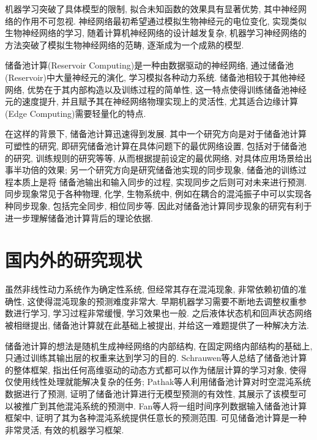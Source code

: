 \documentclass[notitlepage,cs4size,punct,oneside]{ctexrep}
\numberwithin{equation}{chapter}
\theoremstyle{mystyle}
\begin{document}
机器学习突破了具体模型的限制, 拟合未知函数的效果具有显著优势, 
其中神经网络的作用不可忽视. 神经网络最初希望通过模拟生物神经元的电位变化, 
实现类似生物神经网络的学习, 随着计算机神经网络的设计越发复杂, 机器学习神经网络的
方法突破了模拟生物神经网络的范畴, 逐渐成为一个成熟的模型. 

储备池计算(Reservoir Computing)是一种由数据驱动的神经网络, 
通过储备池(Reservoir)中大量神经元的演化, 学习模拟各种动力系统. 
储备池相较于其他神经网络, 优势在于其内部构造以及训练过程的简单性, 
这一特点使得训练储备池神经元的速度提升, 并且赋予其在神经网络物理实现上的灵活性\cite{YTJK}, 
尤其适合边缘计算(Edge Computing)需要轻量化的特点\cite{WSJC}.

在这样的背景下, 储备池计算迅速得到发展. 
其中一个研究方向是对于储备池计算可塑性的研究, 
即研究储备池计算在具体问题下的最优网络设置, 包括对于储备池的研究, 训练规则的研究等等, 
从而根据提前设定的最优网络, 对具体应用场景给出事半功倍的效果; 
另一个研究方向是研究储备池实现的同步现象, 储备池的训练过程本质上是将
储备池输出和输入同步的过程\cite{QZHM}, 实现同步之后则可对未来进行预测. 
同步现象常见于各种物理, 化学, 生物系统中, 
例如在耦合的混沌振子中可以实现各种同步现象, 包括完全同步\cite{LPTC}, 相位同步\cite{MRAP}等. 
因此对储备池计算同步现象的研究有利于进一步理解储备池计算背后的理论依据. 


\section{国内外的研究现状}

虽然非线性动力系统作为确定性系统, 但经常其存在混沌现象, 非常依赖初值的准确性, 
这使得混沌现象的预测难度非常大. 早期机器学习需要不断地去调整权重参数进行学习, 
学习过程非常缓慢, 学习效果也一般. 之后液体状态机\cite{WMTN}和回声状态网络\cite{HJ}
被相继提出, 储备池计算就在此基础上被提出, 并给这一难题提供了一种解决方法. 

储备池计算的想法是随机生成神经网络的内部结构, 在固定网络内部结构的基础上, 
只通过训练其输出层的权重来达到学习的目的. 
Schrauwen等人总结了储备池计算的整体框架, 
指出任何高维驱动的动态方式都可以作为储层计算的学习对象, 
使得仅使用线性处理就能解决复杂的任务\cite{BSDV}; 
Pathak等人利用储备池计算对时空混沌系统数据进行了预测, 
证明了储备池计算进行无模型预测的有效性, 
其展示了该模型可以被推广到其他混沌系统的预测中\cite{JPBH}. 
Fan等人将一组时间序列数据输入储备池计算框架中, 
证明了其为各种混沌系统提供任意长的预测范围\cite{JFJJ}. 
可见储备池计算是一种非常灵活, 有效的机器学习框架. 
\end{document}

